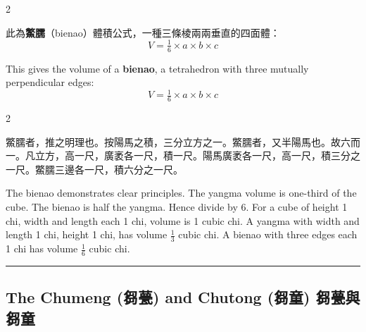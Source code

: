 \documentclass[10pt,a4paper]{article}
\newcommand{\longline}{\noindent\rule{\textwidth}{0.4pt}}
\begin{document}
\begin{paracol}{2}

\begin{leftcolumn*}
此為\textbf{鱉臑}（bienao）體積公式，一種三條棱兩兩垂直的四面體：
\[V = \tfrac{1}{6} \times a \times b \times c\]
\end{leftcolumn*}

\begin{rightcolumn*}
This gives the volume of a \textbf{bienao}, a tetrahedron with three mutually perpendicular edges:
\[V = \tfrac{1}{6} \times a \times b \times c\]
\end{rightcolumn*}

\end{paracol}

\begin{paracol}{2}

\begin{leftcolumn*}
\begin{commentarybi}
鱉臑者，推之明理也。按陽馬之積，三分立方之一。鱉臑者，又半陽馬也。故六而一。凡立方，高一尺，廣袤各一尺，積一尺。陽馬廣袤各一尺，高一尺，積三分之一尺。鱉臑三邊各一尺，積六分之一尺。
\end{commentarybi}
\end{leftcolumn*}

\begin{rightcolumn*}
\begin{commentarybi}
The bienao demonstrates clear principles. The yangma volume is one-third of the cube. The bienao is half the yangma. Hence divide by 6. For a cube of height 1 chi, width and length each 1 chi, volume is 1 cubic chi. A yangma with width and length 1 chi, height 1 chi, has volume $\frac{1}{3}$ cubic chi. A bienao with three edges each 1 chi has volume $\frac{1}{6}$ cubic chi.
\end{commentarybi}
\end{rightcolumn*}

\end{paracol}

\vspace{0.3cm}
\longline
\vspace{0.3cm}

\subsection{The Chumeng (芻甍) and Chutong (芻童) 芻甍與芻童}
\end{document}
